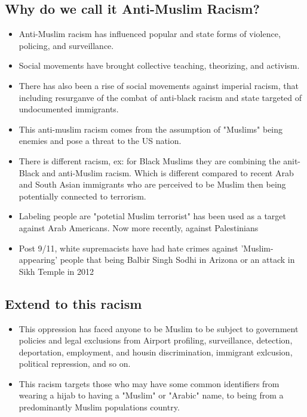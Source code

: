 \documentclass{article}
\begin{document}
  \subsection{Why do we call it Anti-Muslim Racism?}
  \begin{itemize}
    \item Anti-Muslim racism has influenced popular and state forms of
      violence, policing, and surveillance.
    \item Social movements have brought collective teaching,
      theorizing, and activism.
    \item There has also been a rise of social movements against imperial racism,
      that including resurganve of the combat of anti-black racism
      and state targeted of undocumented immigrants.
    \item This anti-muslim racism comes from the assumption of
      "Muslims" being enemies and pose a threat to the US nation.
    \item There is different racism, ex: for Black Muslims they are combining
      the anit-Black and anti-Muslim racism. Which is different compared to
      recent Arab and South Asian immigrants who are perceived to be Muslim
      then being potentially connected to terrorism.
    \item Labeling people are "potetial Muslim terrorist" has been used
      as a target against Arab Americans. Now more recently, against Palestinians
    \item Post 9/11, white supremacists have had hate crimes against 'Muslim-appearing' people
      that being Balbir Singh Sodhi in Arizona or an attack in Sikh Temple in 2012
  \end{itemize}

  \subsection{Extend to this racism}
  \begin{itemize}
    \item This oppression has faced anyone to be Muslim to be subject
      to government policies and legal exclusions from Airport profiling,
      surveillance, detection, deportation, employment, and housin discrimination, immigrant exlcusion,
      political repression, and so on.
    \item This racism targets those who may have some common identifiers from wearing a hijab
      to having a "Muslim" or "Arabic" name, to being from a predominantly
      Muslim populations country.
  \end{itemize}
\end{document}
